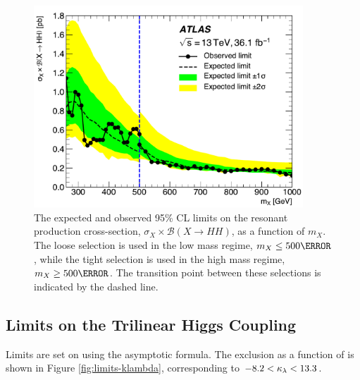 \begin{figure}[htbp]
  \centering
\includegraphics[width=0.9\textwidth]{chapters/chapter5_yybb/images/limits/resonant.pdf}
\caption[The expected and observed limits on the resonant \HH production cross section as a function of $m_{X}$.]
{The expected and observed 95\% \gls{CL} limits on the resonant \HH production cross-section, $\sigma_{X} \times \mathcal{B}(X\rightarrow HH)$, as a function of $m_{X}$. The loose selection is used in the low mass regime, $m_{X} \leq \unit{500}{\GeV}$, while the tight selection is used in the high mass regime, $m_{X} \geq \unit{500}{\GeV}$. The transition point between these selections is indicated by the dashed line.} 
\label{fig:limits-resonant}
\end{figure}

\subsection{Limits on the Trilinear Higgs Coupling}

Limits are set on \klambda using the asymptotic formula. The exclusion as a function of \klambda is shown in Figure \ref{fig:limits-klambda}, corresponding to $-8.2 < \kappa_{\lambda} < 13.3$.

